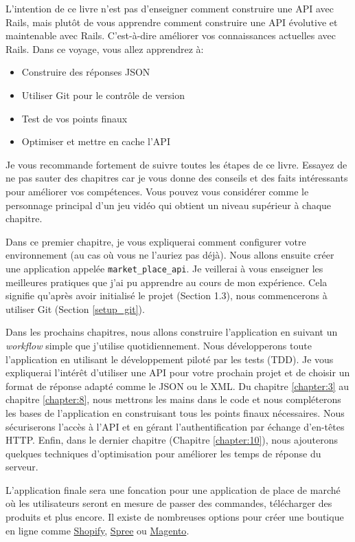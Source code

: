 \documentclass[]{report}
\begin{document}
  L'intention de ce livre n'est pas d'enseigner comment construire une API avec Rails, mais plutôt de vous apprendre comment construire une API évolutive et maintenable avec Rails. C'est-à-dire améliorer vos connaissances actuelles avec Rails. Dans ce voyage, vous allez apprendrez à:

  \begin{itemize}
    \item Construire des réponses JSON
    \item Utiliser Git pour le contrôle de version
    \item Test de vos points finaux
    \item Optimiser et mettre en cache l'API
  \end{itemize}

  Je vous recommande fortement de suivre toutes les étapes de ce livre. Essayez de ne pas sauter des chapitres car je vous donne des conseils et des faits intéressants pour améliorer vos compétences. Vous pouvez vous considérer comme le personnage principal d'un jeu vidéo qui obtient un niveau supérieur à chaque chapitre.

  Dans ce premier chapitre, je vous expliquerai comment configurer votre environnement (au cas où vous ne l'auriez pas déjà). Nous allons ensuite créer une application appelée \verb|market_place_api|. Je veillerai à vous enseigner les meilleures pratiques que j'ai pu apprendre au cours de mon expérience. Cela signifie qu'après avoir initialisé le projet (Section 1.3), nous commencerons à utiliser Git (Section \ref{setup_git}).

  Dans les prochains chapitres, nous allons construire l'application en suivant un \textit{workflow} simple que j'utilise quotidiennement. Nous développerons toute l'application en utilisant le développement piloté par les tests (TDD). Je vous expliquerai l’intérêt d'utiliser une API pour votre prochain projet et de choisir un format de réponse adapté comme le JSON ou le XML. Du chapitre \ref{chapter:3} au chapitre \ref{chapter:8}, nous mettrons les mains dans le code et nous compléterons les bases de l'application en construisant tous les points finaux nécessaires. Nous sécuriserons l'accès à l'API et en gérant l'authentification par échange d'en-têtes HTTP. Enfin, dans le dernier chapitre (Chapitre \ref{chapter:10}), nous ajouterons quelques techniques d'optimisation pour améliorer les temps de réponse du serveur.

  L'application finale sera une foncation pour une application de place de marché où les utilisateurs seront en mesure de passer des commandes, télécharger des produits et plus encore. Il existe de nombreuses options pour créer une boutique en ligne comme \href{http://shopify.com/}{Shopify}, \href{http://spreecommerce.com/}{Spree} ou \href{http://magento.com/}{Magento}.
\end{document}
